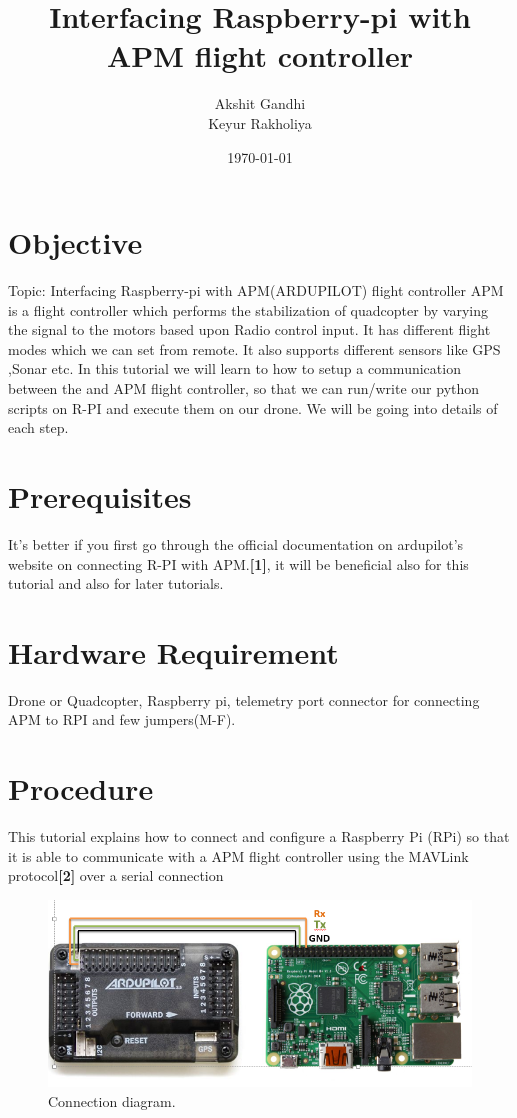 \documentclass[11pt,a4paper]{article}
\title{Interfacing Raspberry-pi with APM flight controller}
\author{Akshit Gandhi \\ Keyur Rakholiya}
\date{\today}
\begin{document}
	\maketitle
	\newpage
	\tableofcontents
	\newpage
	\section{Objective}
	Topic: Interfacing Raspberry-pi with APM(ARDUPILOT) flight controller
			APM is a flight controller which performs the stabilization of quadcopter by varying the signal to the motors based upon Radio control input. It has different flight modes which we can set from remote. It also supports different sensors like GPS ,Sonar etc.
		In this tutorial we will learn to how to setup a communication between the 
		 and APM flight controller, so that we can run/write our python scripts on R-PI and execute them on our drone. We will be going into details of each step.
	\section{Prerequisites}
	 It's better if you first go through the official documentation on ardupilot's website on connecting R-PI		 with APM.\textbf{[1]}, it will be beneficial also for this tutorial and also for later tutorials.
	\section{Hardware Requirement}
	 Drone or Quadcopter, Raspberry pi, telemetry port connector for connecting APM to RPI and few jumpers(M-F).
	\section{Procedure}
	This tutorial explains how to connect and configure a Raspberry Pi (RPi) so that it is able to communicate with a APM flight controller using the MAVLink protocol\textbf{[2]} over a serial connection
	 \begin{figure}[H]
	 	\centering
		\includegraphics[scale=0.35]{wiring}
	 	\caption{Connection diagram.}
\end{figure}
\end{document}

